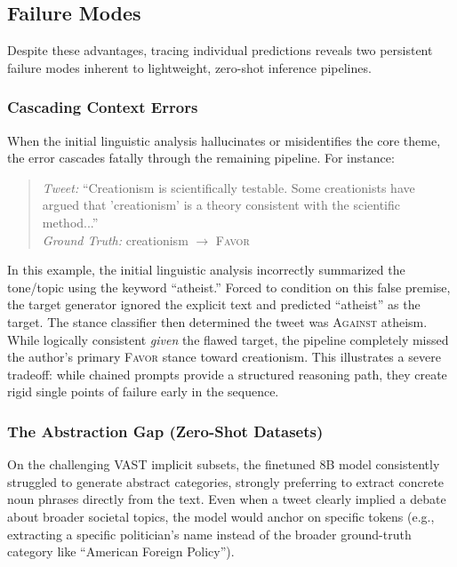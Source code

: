 \documentclass[conference]{IEEEtran}
\begin{document}
\subsection{Failure Modes}

Despite these advantages, tracing individual predictions reveals two persistent failure modes inherent to lightweight, zero-shot inference pipelines.

\subsubsection{Cascading Context Errors}

When the initial linguistic analysis hallucinates or misidentifies the core theme, the error cascades fatally through the remaining pipeline. For instance:

\begin{quote}
\textit{Tweet:} ``Creationism is scientifically testable. Some creationists have argued that 'creationism' is a theory consistent with the scientific method...''\\
\textit{Ground Truth:} creationism $\rightarrow$ \textsc{Favor}
\end{quote}

In this example, the initial linguistic analysis incorrectly summarized the tone/topic using the keyword ``atheist.'' Forced to condition on this false premise, the target generator ignored the explicit text and predicted ``atheist'' as the target. The stance classifier then determined the tweet was \textsc{Against} atheism. While logically consistent \textit{given} the flawed target, the pipeline completely missed the author's primary \textsc{Favor} stance toward creationism. This illustrates a severe tradeoff: while chained prompts provide a structured reasoning path, they create rigid single points of failure early in the sequence.

\subsubsection{The Abstraction Gap (Zero-Shot Datasets)}

On the challenging VAST implicit subsets, the finetuned 8B model consistently struggled to generate abstract categories, strongly preferring to extract concrete noun phrases directly from the text. Even when a tweet clearly implied a debate about broader societal topics, the model would anchor on specific tokens (e.g., extracting a specific politician's name instead of the broader ground-truth category like ``American Foreign Policy''). 
\end{document}
